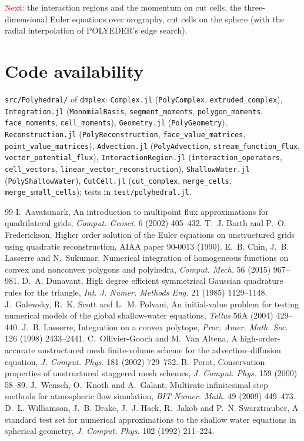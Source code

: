 \documentclass[preprint,12pt]{elsarticle}
\newcommand{\code}[1]{\texttt{#1}}
\theoremstyle{definition}
\begin{document}
\textcolor{red}{Next:} the interaction regions and the momentum on cut cells, the three-dimensional
Euler equations over orography, cut cells on the sphere (with the radial interpolation of POLYEDER's
edge search).

\section*{Code availability}
\code{src/Polyhedral/} of \code{dmplex}: \code{Complex.jl} (\code{PolyComplex},
\code{extruded\_complex}), \code{Integration.jl} (\code{MonomialBasis}, \code{segment\_moments},
\code{polygon\_moments}, \code{face\_moments}, \code{cell\_moments}), \code{Geometry.jl}
(\code{PolyGeometry}), \code{Reconstruction.jl} (\code{PolyReconstruction}, \code{face\_value\_matrices},
\code{point\_value\_matrices}), \code{Advection.jl} (\code{PolyAdvection}, \code{stream\_function\_flux}, \code{vector\_potential\_flux}),
\code{InteractionRegion.jl} (\code{interaction\_operators}, \code{cell\_vectors},
\code{linear\_vector\_reconstruction}), \code{ShallowWater.jl} (\code{PolyShallowWater}),
\code{CutCell.jl} (\code{cut\_complex}, \code{merge\_cells}, \code{merge\_small\_cells});
tests in \code{test/polyhedral.jl}.

\begin{thebibliography}{99}
 I.~Aavatsmark, An introduction to multipoint flux approximations for
  quadrilateral grids, \emph{Comput. Geosci.} 6 (2002) 405--432.
 T.~J. Barth and P.~O. Frederickson, Higher order solution of the Euler equations on
  unstructured grids using quadratic reconstruction, AIAA paper 90-0013 (1990).
 E.~B. Chin, J.~B. Lasserre and N.~Sukumar, Numerical integration of homogeneous
  functions on convex and nonconvex polygons and polyhedra, \emph{Comput. Mech.} 56 (2015) 967--981.
 D.~A. Dunavant, High degree efficient symmetrical Gaussian quadrature rules for the
  triangle, \emph{Int. J. Numer. Methods Eng.} 21 (1985) 1129--1148.
 J.~Galewsky, R.~K. Scott and L.~M. Polvani, An initial-value problem for testing
  numerical models of the global shallow-water equations, \emph{Tellus} 56A (2004) 429--440.
 J.~B. Lasserre, Integration on a convex polytope, \emph{Proc. Amer. Math. Soc.}
  126 (1998) 2433--2441.
 C.~Ollivier-Gooch and M.~Van Altena, A high-order-accurate unstructured mesh
  finite-volume scheme for the advection--diffusion equation, \emph{J. Comput. Phys.} 181 (2002) 729--752.
 B.~Perot, Conservation properties of unstructured staggered mesh schemes,
  \emph{J. Comput. Phys.} 159 (2000) 58--89.
 J.~Wensch, O.~Knoth and A.~Galant, Multirate infinitesimal step methods for
  atmospheric flow simulation, \emph{BIT Numer. Math.} 49 (2009) 449--473.
 D.~L. Williamson, J.~B. Drake, J.~J. Hack, R.~Jakob and P.~N. Swarztrauber, A standard
  test set for numerical approximations to the shallow water equations in spherical geometry,
  \emph{J. Comput. Phys.} 102 (1992) 211--224.
\end{thebibliography}
\end{document}
